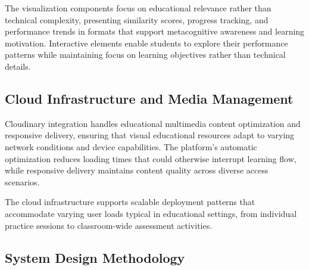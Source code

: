 {The visualization components focus on educational relevance rather than technical complexity, presenting similarity scores, progress tracking, and performance trends in formats that support metacognitive awareness and learning motivation. Interactive elements enable students to explore their performance patterns while maintaining focus on learning objectives rather than technical details.

\subsection{Cloud Infrastructure and Media Management}

Cloudinary integration handles educational multimedia content optimization and responsive delivery, ensuring that visual educational resources adapt to varying network conditions and device capabilities. The platform's automatic optimization reduces loading times that could otherwise interrupt learning flow, while responsive delivery maintains content quality across diverse access scenarios.

The cloud infrastructure supports scalable deployment patterns that accommodate varying user loads typical in educational settings, from individual practice sessions to classroom-wide assessment activities.
}

\subsection{System Design Methodology}

